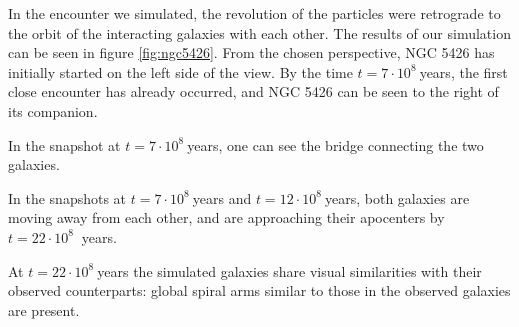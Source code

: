 \documentclass[11pt,twocolumn]{article}
\newcommand{\unit}[1]{\ensuremath{\, \mathrm{#1}}}
\begin{document}
        
In the encounter we simulated, the revolution of the particles were retrograde to the orbit of the interacting galaxies with each other. The results of our simulation can be seen in figure \ref{fig:ngc5426}. From the chosen perspective, NGC 5426 has initially started on the left side of the view. By the time $t=7\cdot 10^8\:$years, the first close encounter has already occurred, and NGC 5426 can be seen to the right of its companion.

In the snapshot at  $t=7\cdot 10^8\:$years, one can see the bridge connecting the two galaxies. 
        
In the snapshots at $t=7\cdot 10^8\:$years and $t=12\cdot 10^8\:$years, both galaxies are moving away from each other, and are approaching their apocenters by $t=22\cdot 10^8\:$ years.

        
At $t=22\cdot 10^8\:$years the simulated galaxies share visual similarities with their observed counterparts: global spiral arms similar to those in the observed galaxies are present.
        
\end{document}
